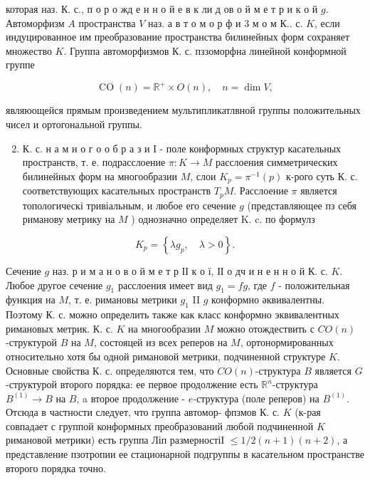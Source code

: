 \documentclass[10pt]{article}
\begin{document}
которая наз. К. с., п о р о жд е н н о й е в к ли д ов о й м е т р и к о й $g$. Автоморфизм $A$ пространства $V$ наз. а в т о м о р ф и 3 м о м К.. с. $K$, если индуцированное им преобразование пространства билинейных форм сохраняет множество $K$. Группа автоморфизмов К. с. пззоморфна линейной конформной группе



\[

\operatorname{CO}(n)=\mathbb{R}^{+} \times O(n), \quad n=\operatorname{dim} V,

\]



являюощейся прямым произведением мультипликатлвной группы положительных чисел и ортогональной группы.



\begin{enumerate}

  \setcounter{enumi}{1}

  \item К. с. н а м н о г о о б р а з и І - поле конформных структур касательных пространств, т. е. подрасслоение $\pi: K \rightarrow M$ расслоения симметрических билинейных форм на многообразии $M$, слои $K_{p}=\pi^{-1}(p)$ к-рого суть К. с. соответствующих касательных пространств $T_{p} M$. Расслоение $\pi$ является топологическі тривіальным, и любое его сечение $g$ (представляющее пз себя риманову метрику на $M$ ) однозначно определяет K. c. по формулз

\end{enumerate}



\[

K_{p}=\left\{\lambda g_{p}, \quad \lambda>0\right\} .

\]



Сечение $g$ наз. р и м а н о в о й м е т р ІІ к о ї, ІІ о дч и н е н н о й К. с. $K$. Любое другое сечение $g_{1}$ расслоения имеет вид $g_{1}=f g$, где $f$ - положительная функция на $M$, т. е. римановы метрики $g_{1}$ II $g$ конформно әквивалентны. Поэтому К. с. можно определить также как класс конформно эквивалентных римановых метрик. К. с. $K$ на многообразии $M$ можно отождествить с $C O(n)$-структурой $B$ на $M$, состояцей из всех реперов на $M$, ортонормированных относительно хотя бы одной римановой метрики, подчиненной структуре $K$. Основные свойства К. с. определяются тем, что $C O(n)$-структура $B$ является $G$-структурой второго порядка: ее первое продолжение есть $\mathbb{R}^{n}$-структура $B^{(1)} \rightarrow B$ на $B$, a второе продолжение - $e$-структура (поле реперов) на $B^{(1)}$. Отсюда в частности следует, что группа автомор- фпзмов К. с. $K$ (к-рая совпадает с группой конформных преобразований любой подчиненной $K$ римановой метрики) есть группа Ліп размерностіІ $\leqslant 1 / 2(n+1)(n+2)$, а представление пзотропии ее стационарной подгруппы в касательном пространстве второго порядка точно.
\end{document}
